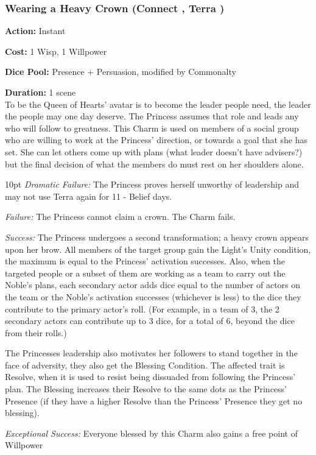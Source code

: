 	\subsubsection*{Wearing a Heavy Crown (Connect \textbullet\textbullet\textbullet\textbullet\textbullet, Terra \textbullet\textbullet\textbullet\textbullet)}

\noindent \textbf{Action:} Instant

\noindent \textbf{Cost:} 1 Wisp, 1 Willpower

\noindent \textbf{Dice Pool:} Presence + Persuasion, modified by Commonalty

\noindent \textbf{Duration:} 1 scene \\

\noindent To be the Queen of Hearts' avatar is to become the leader people need, the leader the people may one day deserve. The Princess assumes that role and leads any who will follow to greatness. This Charm is used on members of a social group who are willing to work at the Princess' direction, or towards a goal that she has set. She can let others come up with plans (what leader doesn’t have advisers?) but the final decision of what the members do must rest on her shoulders alone.

\begin{myindentpar}{10pt}    \emph{Dramatic Failure:} The Princess proves herself unworthy of leadership and may not use Terra again for 11 - Belief days. 

    \emph{Failure:} The Princess cannot claim a crown. The Charm fails.

    \emph{Success:} The Princess undergoes a second transformation; a heavy crown appears upon her brow. All members of the target group gain the Light's Unity condition, the maximum is equal to the Princess' activation successes. Also, when the targeted people or a subset of them are working as a team to carry out the Noble’s plans, each secondary actor adds dice equal to the number of actors on the team or the Noble’s activation successes (whichever is less) to the dice they contribute to the primary actor’s roll. (For example, in a team of 3, the 2 secondary actors can contribute up to 3 dice, for a total of 6, beyond the dice from their rolls.)
    
    The Princesses leadership also motivates her followers to stand together in the face of adversity, they also get the Blessing Condition. The affected trait is Resolve, when it is used to resist being dissuaded from following the Princess' plan. The Blessing increases their Resolve to the same dots as the Princess' Presence (if they have a higher Resolve than the Princess' Presence they get no blessing). 

    \emph{Exceptional Success:} Everyone blessed by this Charm also gains a free point of Willpower\end{myindentpar}

